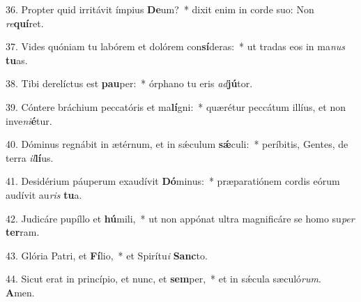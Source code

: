36. Propter quid irritávit ímpius \textbf{De}um?~*  dixit enim in corde suo: Non \textit{re}\textbf{quí}ret.\

37. Vides quóniam tu labórem et dolórem con\textbf{sí}deras:~*  ut tradas eos in ma\textit{nus} \textbf{tu}as.\

38. Tibi derelíctus est \textbf{pau}per:~*  órphano tu eris \textit{ad}\textbf{jú}tor.\

39. Cóntere bráchium peccatóris et ma\textbf{lí}gni:~*  quærétur peccátum illíus, et non inve\textit{ni}\textbf{é}tur.\

40. Dóminus regnábit in ætérnum, et in sǽculum \textbf{sǽ}culi:~*  períbitis, Gentes, de terra \textit{il}\textbf{lí}us.\

41. Desidérium páuperum exaudívit \textbf{Dó}minus:~*  præparatiónem cordis eórum audívit au\textit{ris} \textbf{tu}a.\

42. Judicáre pupíllo et \textbf{hú}mili,~*  ut non appónat ultra magnificáre se homo su\textit{per} \textbf{ter}ram.\

43. Glória Patri, et \textbf{Fí}lio,~*  et Spirítu\textit{i} \textbf{Sanc}to.\

44. Sicut erat in princípio, et nunc, et \textbf{sem}per,~*  et in sǽcula sæculó\textit{rum}. \textbf{A}men.\

